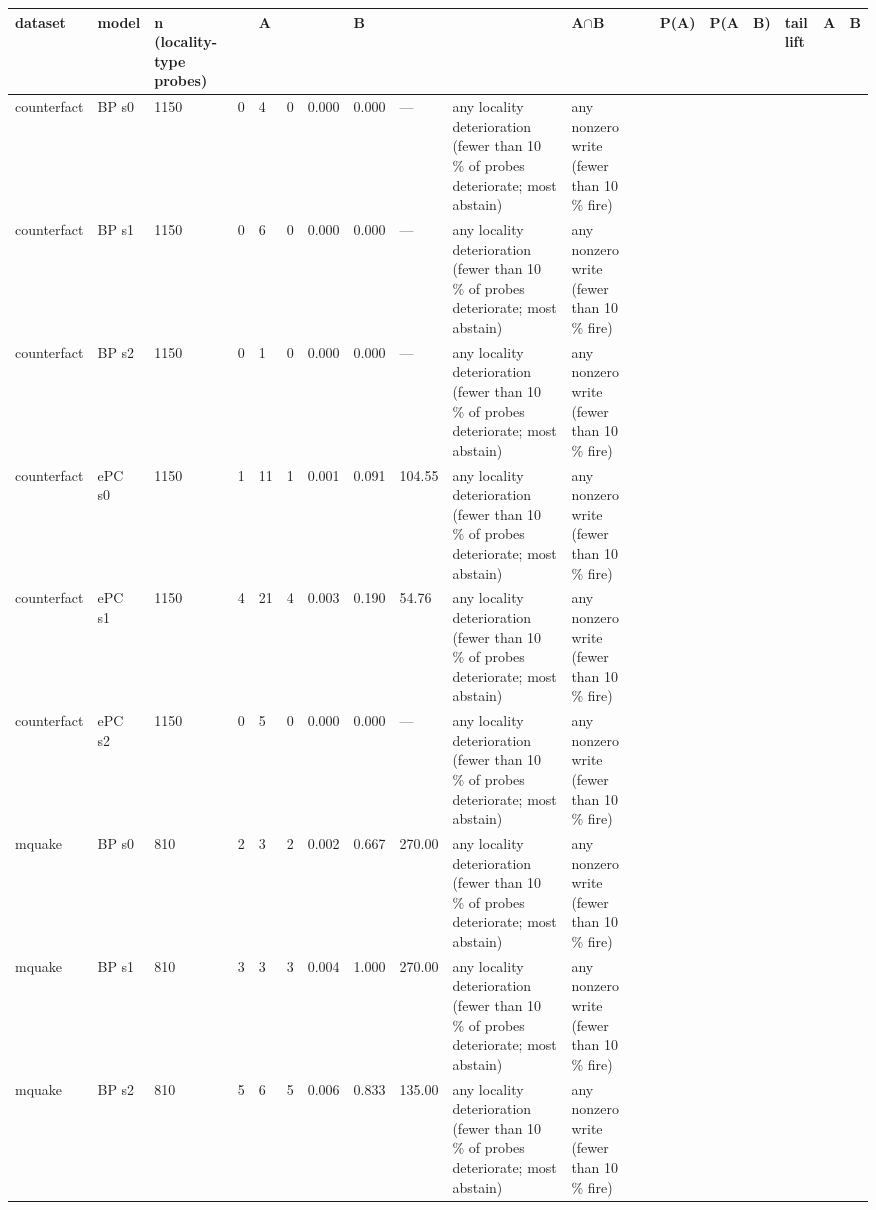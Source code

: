 \documentclass[10pt,a4paper]{article}
\begin{document}
\begin{center}\tiny
\begin{tabularx}{\textwidth}{@{}p{}XXXXXXXXXXXXXXXXX@{}}
\toprule
dataset & model & n (locality-type probes) &  & A &  &  & B &  &  & A$\cap$B &  & P(A) & P(A & B) & tail lift & A & B \\ \midrule
counterfact & BP s0 & 1150 & 0 & 4 & 0 & 0.000 & 0.000 & — & any locality deterioration (fewer than 10 \% of probes deteriorate; most abstain) & any nonzero write (fewer than 10 \% fire) &  &  &  &  &  &  &  \\
counterfact & BP s1 & 1150 & 0 & 6 & 0 & 0.000 & 0.000 & — & any locality deterioration (fewer than 10 \% of probes deteriorate; most abstain) & any nonzero write (fewer than 10 \% fire) &  &  &  &  &  &  &  \\
counterfact & BP s2 & 1150 & 0 & 1 & 0 & 0.000 & 0.000 & — & any locality deterioration (fewer than 10 \% of probes deteriorate; most abstain) & any nonzero write (fewer than 10 \% fire) &  &  &  &  &  &  &  \\
counterfact & ePC s0 & 1150 & 1 & 11 & 1 & 0.001 & 0.091 & 104.55 & any locality deterioration (fewer than 10 \% of probes deteriorate; most abstain) & any nonzero write (fewer than 10 \% fire) &  &  &  &  &  &  &  \\
counterfact & ePC s1 & 1150 & 4 & 21 & 4 & 0.003 & 0.190 & 54.76 & any locality deterioration (fewer than 10 \% of probes deteriorate; most abstain) & any nonzero write (fewer than 10 \% fire) &  &  &  &  &  &  &  \\
counterfact & ePC s2 & 1150 & 0 & 5 & 0 & 0.000 & 0.000 & — & any locality deterioration (fewer than 10 \% of probes deteriorate; most abstain) & any nonzero write (fewer than 10 \% fire) &  &  &  &  &  &  &  \\
mquake & BP s0 & 810 & 2 & 3 & 2 & 0.002 & 0.667 & 270.00 & any locality deterioration (fewer than 10 \% of probes deteriorate; most abstain) & any nonzero write (fewer than 10 \% fire) &  &  &  &  &  &  &  \\
mquake & BP s1 & 810 & 3 & 3 & 3 & 0.004 & 1.000 & 270.00 & any locality deterioration (fewer than 10 \% of probes deteriorate; most abstain) & any nonzero write (fewer than 10 \% fire) &  &  &  &  &  &  &  \\
mquake & BP s2 & 810 & 5 & 6 & 5 & 0.006 & 0.833 & 135.00 & any locality deterioration (fewer than 10 \% of probes deteriorate; most abstain) & any nonzero write (fewer than 10 \% fire) &  &  &  &  &  &  &  \\

\end{tabularx}
\end{center}
\end{document}
